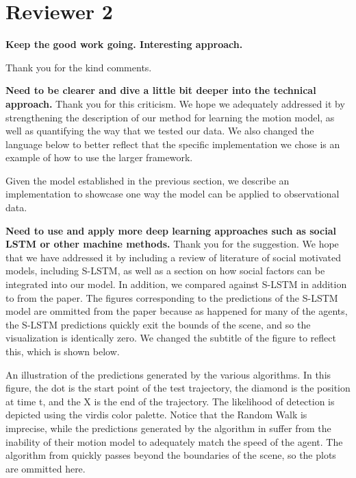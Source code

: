 \documentclass[usenames,dvipsnames]{article}
\providecommand{\response}[1]{
\noindent
\noindent\colorbox{gray!20}{
\parbox{\textwidth}{
\setlength{\parskip}{.1in}
\setlength{\parindent}{.1in}
#1}
}
}
\begin{document}
\section*{Reviewer 2}
\begin{enumerate}
\begin{item}
\textbf{Keep the good work going. Interesting approach.}
\end{item}

Thank you for the kind comments.
\begin{item}
\textbf{
Need to be clearer and
dive a little bit deeper into the technical approach. }
Thank you for this criticism. We hope we adequately addressed it by strengthening the description of our method for learning the motion model, as well as quantifying the way that we tested our data. We also changed the language below to better reflect that the specific implementation we chose is an example of how to use the larger framework.

\reversemarginpar{}
\response{Given the model established in the previous section, we describe an implementation to showcase one way the model can be applied to observational data.}
\end{item}
\begin{item}
\textbf{
Need to use and apply more deep learning approaches such as social LSTM
or other machine methods.}
Thank you for the suggestion. We hope that we have addressed it by including a review of literature of social motivated models, including S-LSTM, as well as a section on how social factors can be integrated into our model. In addition, we compared against S-LSTM in addition to \cite{Kitani2012} from the paper. The figures corresponding to the predictions of the S-LSTM model are ommitted from the paper because as happened for many of the agents, the S-LSTM predictions quickly exit the bounds of the scene, and so the visualization is identically zero. We changed the subtitle of the figure to reflect this, which is shown below.

\reversemarginpar{}
\response{An illustration of the predictions generated by the various algorithms. In this figure, the dot is the start point of the test trajectory, the diamond is the position at time t, and the X is the end of the trajectory. The likelihood of detection is depicted using the virdis color palette. Notice that the Random Walk is imprecise, while the predictions generated by the algorithm in \cite{Kitani2012} suffer from the inability of their motion model to adequately match the speed of the agent. The algorithm from \cite{Alahi2016} quickly passes beyond the boundaries of the scene, so the plots are ommitted here.
}


\end{item}
\end{enumerate}
\end{document}
